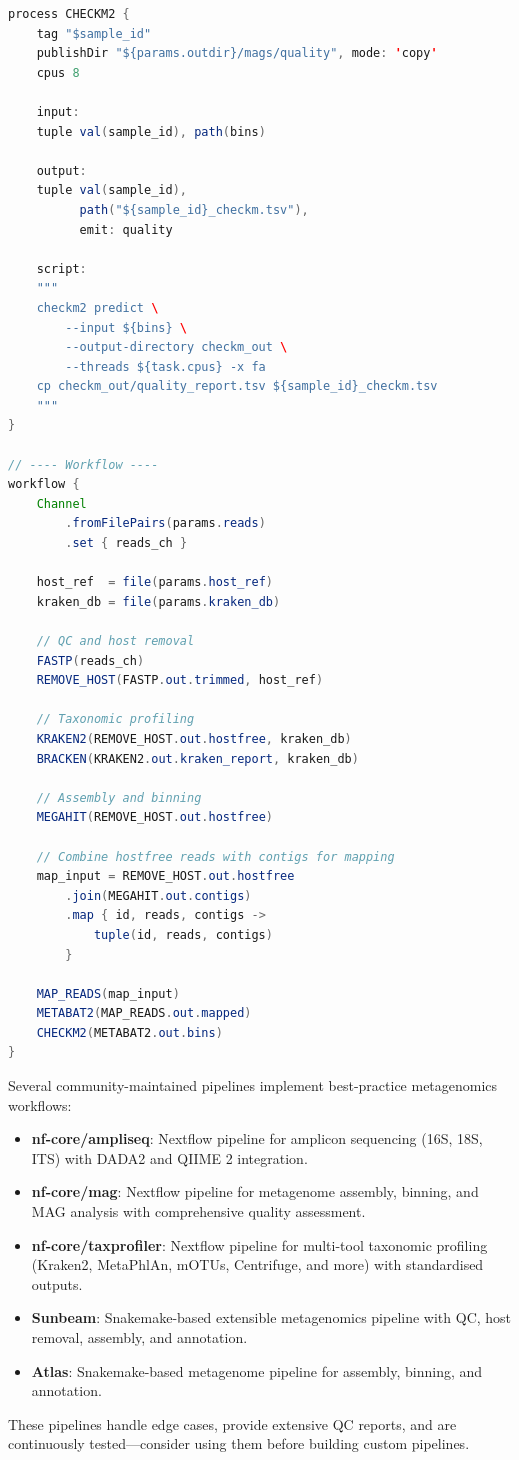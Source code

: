 \begin{lstlisting}[language=Java, caption={Nextflow DSL2 pipeline for shotgun metagenomics analysis.}, label={lst:nextflow_meta}]
process CHECKM2 {
    tag "$sample_id"
    publishDir "${params.outdir}/mags/quality", mode: 'copy'
    cpus 8

    input:
    tuple val(sample_id), path(bins)

    output:
    tuple val(sample_id),
          path("${sample_id}_checkm.tsv"),
          emit: quality

    script:
    """
    checkm2 predict \
        --input ${bins} \
        --output-directory checkm_out \
        --threads ${task.cpus} -x fa
    cp checkm_out/quality_report.tsv ${sample_id}_checkm.tsv
    """
}

// ---- Workflow ----
workflow {
    Channel
        .fromFilePairs(params.reads)
        .set { reads_ch }

    host_ref  = file(params.host_ref)
    kraken_db = file(params.kraken_db)

    // QC and host removal
    FASTP(reads_ch)
    REMOVE_HOST(FASTP.out.trimmed, host_ref)

    // Taxonomic profiling
    KRAKEN2(REMOVE_HOST.out.hostfree, kraken_db)
    BRACKEN(KRAKEN2.out.kraken_report, kraken_db)

    // Assembly and binning
    MEGAHIT(REMOVE_HOST.out.hostfree)

    // Combine hostfree reads with contigs for mapping
    map_input = REMOVE_HOST.out.hostfree
        .join(MEGAHIT.out.contigs)
        .map { id, reads, contigs ->
            tuple(id, reads, contigs)
        }

    MAP_READS(map_input)
    METABAT2(MAP_READS.out.mapped)
    CHECKM2(METABAT2.out.bins)
}
\end{lstlisting}

\begin{protocolbox}[title={Community-Curated Metagenomics Pipelines}]
Several community-maintained pipelines implement best-practice metagenomics workflows:
\begin{itemize}[nosep]
  \item \textbf{nf-core/ampliseq}: Nextflow pipeline for amplicon sequencing (16S, 18S, ITS) with DADA2 and QIIME 2 integration.
  \item \textbf{nf-core/mag}: Nextflow pipeline for metagenome assembly, binning, and MAG analysis with comprehensive quality assessment.
  \item \textbf{nf-core/taxprofiler}: Nextflow pipeline for multi-tool taxonomic profiling (Kraken2, MetaPhlAn, mOTUs, Centrifuge, and more) with standardised outputs.
  \item \textbf{Sunbeam}: Snakemake-based extensible metagenomics pipeline with QC, host removal, assembly, and annotation.
  \item \textbf{Atlas}: Snakemake-based metagenome pipeline for assembly, binning, and annotation.
\end{itemize}
These pipelines handle edge cases, provide extensive QC reports, and are continuously tested---consider using them before building custom pipelines.
\end{protocolbox}

